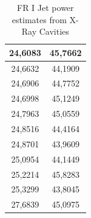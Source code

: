 \documentclass[11pt,
               a4paper,
               parskip=half, style=authoryear, citestyle=authoryear-comp
              bibliography=totoc,
               ]{scrartcl}
\begin{document}
\begin{table}[h]
\begin{tabular}{|c|c|}
              \hline
              24,6083 & 45,7662\\
              \hline
              24,6632 & 44,1909\\
              \hline
              24,6906 & 44,7752\\
              \hline
              24,6998 & 45,1249\\
              \hline
              24,7963 & 45,0559\\
              \hline
              24,8516 & 44,4164\\
              \hline
              24,8701 & 43,9609\\
              \hline
              25,0954 & 44,1449\\
              \hline
              25,2214 & 45,8283\\
              \hline
              25,3299 & 43,8045 \\ 
              \hline
              27,6839 & 45,0975 \\
              \hline
              
      \end{tabular}
      \caption{FR I Jet power estimates from X-Ray Cavities}
       \label{tab:my_label}
        \end{table}
\end{document}
